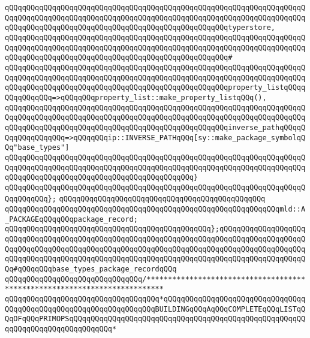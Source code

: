 \verb|qQQqqQQqqQQqqQQqqQQqqQQqqQQqqQQqqQQqqQQqqQQqqQQqqQQqqQQqqQQqqQQqqQQqqQQqqQQqqQQqqQQqqQQqqQQqqQQqqQQqqQQqqQQqqQQqqQQqqQQqqQQqqQQqqQQqqQQqqQQqqQQqqQQqqQQqqQQqqQQqqQQqqQQqqQQqqQQqqQQqqQQqqQQqqQQqtyperstore,|\newline
\verb|qQQqqQQqqQQqqQQqqQQqqQQqqQQqqQQqqQQqqQQqqQQqqQQqqQQqqQQqqQQqqQQqqQQqqQQqqQQqqQQqqQQqqQQqqQQqqQQqqQQqqQQqqQQqqQQqqQQqqQQqqQQqqQQqqQQqqQQqqQQqqQQqqQQqqQQqqQQqqQQqqQQqqQQqqQQqqQQqqQQqqQQqqQQqqQQq#|\newline
\verb|qQQqqQQqqQQqqQQqqQQqqQQqqQQqqQQqqQQqqQQqqQQqqQQqqQQqqQQqqQQqqQQqqQQqqQQqqQQqqQQqqQQqqQQqqQQqqQQqqQQqqQQqqQQqqQQqqQQqqQQqqQQqqQQqqQQqqQQqqQQqqQQqqQQqqQQqqQQqqQQqqQQqqQQqqQQqqQQqqQQqqQQqqQQqqQQqproperty_listqQQqqQQqqQQqqQQq=>qQQqqQQqproperty_list::make_property_listqQQq(),|\newline
\verb|qQQqqQQqqQQqqQQqqQQqqQQqqQQqqQQqqQQqqQQqqQQqqQQqqQQqqQQqqQQqqQQqqQQqqQQqqQQqqQQqqQQqqQQqqQQqqQQqqQQqqQQqqQQqqQQqqQQqqQQqqQQqqQQqqQQqqQQqqQQqqQQqqQQqqQQqqQQqqQQqqQQqqQQqqQQqqQQqqQQqqQQqqQQqqQQqinverse_pathqQQqqQQqqQQqqQQqqQQq=>qQQqqQQqip::INVERSE_PATHqQQq[sy::make_package_symbolqQQq"base_types"]|\newline
\verb|qQQqqQQqqQQqqQQqqQQqqQQqqQQqqQQqqQQqqQQqqQQqqQQqqQQqqQQqqQQqqQQqqQQqqQQqqQQqqQQqqQQqqQQqqQQqqQQqqQQqqQQqqQQqqQQqqQQqqQQqqQQqqQQqqQQqqQQqqQQqqQQqqQQqqQQqqQQqqQQqqQQqqQQqqQQqqQQqqQQqqQQq}|\newline
\verb|qQQqqQQqqQQqqQQqqQQqqQQqqQQqqQQqqQQqqQQqqQQqqQQqqQQqqQQqqQQqqQQqqQQqqQQqqQQqqQQq};|\newline
\verb|qQQqqQQqqQQqqQQqqQQqqQQqqQQqqQQqqQQqqQQqqQQqqQQq|\newline
\verb|qQQqqQQqqQQqqQQqqQQqqQQqqQQqqQQqqQQqqQQqqQQqqQQqqQQqqQQqqQQqqQQqmld::A_PACKAGEqQQqqQQqpackage_record;|\newline
\verb|qQQqqQQqqQQqqQQqqQQqqQQqqQQqqQQqqQQqqQQqqQQqqQQq};qQQqqQQqqQQqqQQqqQQqqQQqqQQqqQQqqQQqqQQqqQQqqQQqqQQqqQQqqQQqqQQqqQQqqQQqqQQqqQQqqQQqqQQqqQQqqQQqqQQqqQQqqQQqqQQqqQQqqQQqqQQqqQQqqQQqqQQqqQQqqQQqqQQqqQQqqQQqqQQqqQQqqQQqqQQqqQQqqQQqqQQqqQQqqQQqqQQqqQQqqQQqqQQqqQQqqQQqqQQqqQQqqQQqqQQq#qQQqqQQqbase_types_package_recordqQQq|\newline
\newline
\newline
\verb|qQQqqQQqqQQqqQQqqQQqqQQqqQQqqQQq/**************************************************************************|\newline
\verb|qQQqqQQqqQQqqQQqqQQqqQQqqQQqqQQqqQQq*qQQqqQQqqQQqqQQqqQQqqQQqqQQqqQQqqQQqqQQqqQQqqQQqqQQqqQQqqQQqqQQqqQQqBUILDINGqQQqAqQQqCOMPLETEqQQqLISTqQQqOFqQQqPRIMOPSqQQqqQQqqQQqqQQqqQQqqQQqqQQqqQQqqQQqqQQqqQQqqQQqqQQqqQQqqQQqqQQqqQQqqQQqqQQqqQQq*|\newline
